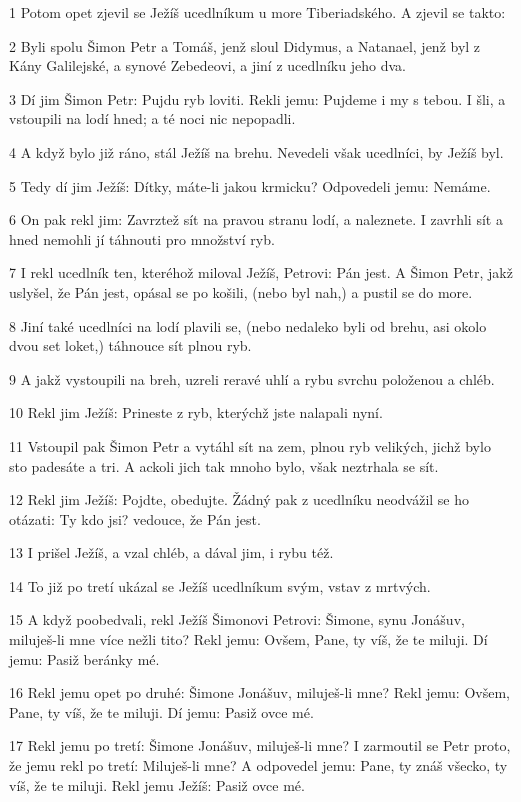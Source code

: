 \par 1 Potom opet zjevil se Ježíš ucedlníkum u more Tiberiadského. A zjevil se takto:
\par 2 Byli spolu Šimon Petr a Tomáš, jenž sloul Didymus, a Natanael, jenž byl z Kány Galilejské, a synové Zebedeovi, a jiní z ucedlníku jeho dva.
\par 3 Dí jim Šimon Petr: Pujdu ryb loviti. Rekli jemu: Pujdeme i my s tebou. I šli, a vstoupili na lodí hned; a té noci nic nepopadli.
\par 4 A když bylo již ráno, stál Ježíš na brehu. Nevedeli však ucedlníci, by Ježíš byl.
\par 5 Tedy dí jim Ježíš: Dítky, máte-li jakou krmicku? Odpovedeli jemu: Nemáme.
\par 6 On pak rekl jim: Zavrztež sít na pravou stranu lodí, a naleznete. I zavrhli sít a hned nemohli jí táhnouti pro množství ryb.
\par 7 I rekl ucedlník ten, kteréhož miloval Ježíš, Petrovi: Pán jest. A Šimon Petr, jakž uslyšel, že Pán jest, opásal se po košili, (nebo byl nah,) a pustil se do more.
\par 8 Jiní také ucedlníci na lodí plavili se, (nebo nedaleko byli od brehu, asi okolo dvou set loket,) táhnouce sít plnou ryb.
\par 9 A jakž vystoupili na breh, uzreli reravé uhlí a rybu svrchu položenou a chléb.
\par 10 Rekl jim Ježíš: Prineste z ryb, kterýchž jste nalapali nyní.
\par 11 Vstoupil pak Šimon Petr a vytáhl sít na zem, plnou ryb velikých, jichž bylo sto padesáte a tri. A ackoli jich tak mnoho bylo, však neztrhala se sít.
\par 12 Rekl jim Ježíš: Pojdte, obedujte. Žádný pak z ucedlníku neodvážil se ho otázati: Ty kdo jsi? vedouce, že Pán jest.
\par 13 I prišel Ježíš, a vzal chléb, a dával jim, i rybu též.
\par 14 To již po tretí ukázal se Ježíš ucedlníkum svým, vstav z mrtvých.
\par 15 A když poobedvali, rekl Ježíš Šimonovi Petrovi: Šimone, synu Jonášuv, miluješ-li mne více nežli tito? Rekl jemu: Ovšem, Pane, ty víš, že te miluji. Dí jemu: Pasiž beránky mé.
\par 16 Rekl jemu opet po druhé: Šimone Jonášuv, miluješ-li mne? Rekl jemu: Ovšem, Pane, ty víš, že te miluji. Dí jemu: Pasiž ovce mé.
\par 17 Rekl jemu po tretí: Šimone Jonášuv, miluješ-li mne? I zarmoutil se Petr proto, že jemu rekl po tretí: Miluješ-li mne? A odpovedel jemu: Pane, ty znáš všecko, ty víš, že te miluji. Rekl jemu Ježíš: Pasiž ovce mé.
